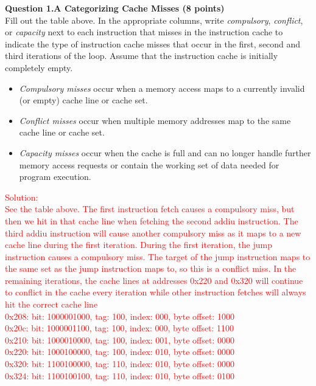 \documentclass[a4paper,10pt]{article}
\begin{document}
\begin{enumerate}
\textbf{Question 1.A Categorizing Cache Misses (8 points)}\\
Fill out the table above. In the appropriate columns, write \textit{compulsory}, \textit{conflict}, or \textit{capacity} next to each instruction that misses in the instruction cache to indicate the type of instruction cache misses that occur in the first, second and third iterations of the loop. Assume that the instruction cache is initially completely empty.
\begin{itemize}
    \item \textit{Compulsory misses} occur when a memory access maps to a currently invalid (or empty) cache line or cache set.
    \item \textit{Conflict misses} occur when multiple memory addresses map to the same cache line or cache set.
    \item \textit{Capacity misses} occur when the cache is full and can no longer handle further memory access requests or contain the working set of data needed for program execution.
\end{itemize}



\noindent\fbox
{%
    \parbox{\linewidth}
    {%
\textcolor{red}{
Solution: \\
See the table above. The first instruction fetch causes a compulsory miss, but then we hit in that cache line when fetching the second addiu instruction. The third addiu instruction will cause another compulsory miss as it maps to a new cache line during the first iteration. During the first iteration, the jump instruction causes a compulsory miss. The target of the jump instruction maps to the same set as the jump instruction maps to, so this is a conflict miss. In the remaining iterations, the cache lines at addresses 0x220 and 0x320 will continue to conflict in the cache every iteration while other instruction fetches will always hit the correct cache line
\\
0x208: bit: 1000001000, tag: 100, index: 000, byte offset: 1000 \\
0x20c: bit: 1000001100, tag: 100, index: 000, byte offset: 1100 \\
0x210: bit: 1000010000, tag: 100, index: 001, byte offset: 0000 \\
0x220: bit: 1000100000, tag: 100, index: 010, byte offset: 0000 \\
0x320: bit: 1100100000, tag: 110, index: 010, byte offset: 0000 \\
0x324: bit: 1100100100, tag: 110, index: 010, byte offset: 0100 }
    }%
}
\\


\end{enumerate}
\end{document}
